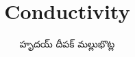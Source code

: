 \documentclass{article}
\title{Conductivity}
\author{\begin{telugu}హృదయ్ దీపక్ మల్లుభొట్ల\end{telugu}}
\date{}
\newcommand{\onlyinsubfile}[1]{#1}
\newcommand{\notinsubfile}[1]{}
\begin{document}
\renewcommand{\onlyinsubfile}[1]{}
\renewcommand{\notinsubfile}[1]{#1}

\maketitle

\tableofcontents





\end{document}
